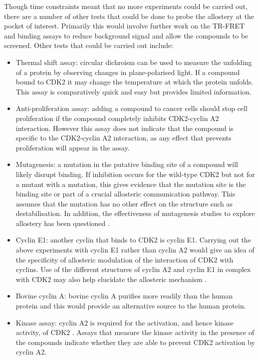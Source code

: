 Though time constraints meant that no more experiments could be carried out, there are a number of other tests that could be done to probe the allostery at the pocket of interest.
Primarily this would involve further work on the TR-FRET and binding assays to reduce background signal and allow the compounds to be screened.
Other tests that could be carried out include:

\begin{itemize}
\item Thermal shift assay: circular dichroism can be used to measure the unfolding of a protein by observing changes in plane-polarised light.
If a compound bound to CDK2 it may change the temperature at which the protein unfolds.
This assay is comparatively quick and easy but provides limited information.
\item Anti-proliferation assay: adding a compound to cancer cells should stop cell proliferation if the compound completely inhibits CDK2-cyclin A2 interaction.
However this assay does not indicate that the compound is specific to the CDK2-cyclin A2 interaction, as any effect that prevents proliferation will appear in the assay.
\item Mutagenesis: a mutation in the putative binding site of a compound will likely disrupt binding.
If inhibition occurs for the wild-type CDK2 but not for a mutant with a mutation, this gives evidence that the mutation site is the binding site or part of a crucial allosteric communication pathway.
This assumes that the mutation has no other effect on the structure such as destabilisation.
In addition, the effectiveness of mutagenesis studies to explore allostery has been questioned \cite{Tang2017}.
\item Cyclin E1: another cyclin that binds to CDK2 is cyclin E1.
Carrying out the above experiments with cyclin E1 rather than cyclin A2 would give an idea of the specificity of allosteric modulation of the interaction of CDK2 with cyclins.
Use of the different structures of cyclin A2 and cyclin E1 in complex with CDK2 may also help elucidate the allosteric mechanism \cite{Honda2005}.
\item Bovine cyclin A: bovine cyclin A purifies more readily than the human protein \cite{Brown2015} and this would provide an alternative source to the human protein.
\item Kinase assay: cyclin A2 is required for the activation, and hence kinase activity, of CDK2 \cite{Jeffrey1995}.
Assays that measure the kinase activity in the presence of the compounds indicate whether they are able to prevent CDK2 activation by cyclin A2.

\end{itemize}
